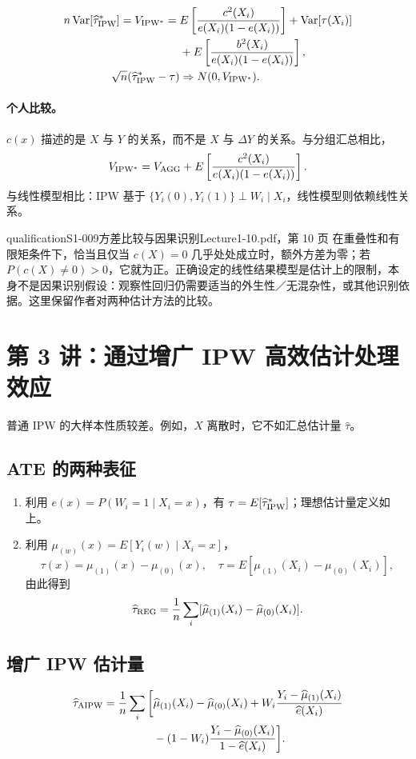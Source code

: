 \begin{align*}
n\operatorname{Var}[\widehat\tau^*_{\rm IPW}]
=V_{\rm IPW^*}
={}&E\left[\frac{c^2(X_i)}{e(X_i)(1-e(X_i))}\right]
+\operatorname{Var}[\tau(X_i)]\\
&+E\left[\frac{b^2(X_i)}{e(X_i)(1-e(X_i))}\right],\\
\sqrt n(\widehat\tau^*_{\rm IPW}-\tau)&\Rightarrow N(0,V_{\rm IPW^*}).
\end{align*}
\paragraph{个人比较。}
$c(x)$ 描述的是 $X$ 与 $Y$ 的关系，而不是 $X$ 与 $\Delta Y$ 的关系。与分组汇总相比，
\[
V_{\rm IPW^*}=V_{\rm AGG}+E\left[\frac{c^2(X_i)}{e(X_i)(1-e(X_i))}\right].
\]
与线性模型相比：IPW 基于 $\{Y_i(0),Y_i(1)\}\perp W_i\mid X_i$，线性模型则依赖线性关系。
\begin{reviewnote}{qualification}{S1-009}{方差比较与因果识别}{Lecture1-10.pdf，第 10 页}
在重叠性和有限矩条件下，恰当且仅当 $c(X)=0$ 几乎处处成立时，额外方差为零；若 $P(c(X)\ne0)>0$，它就为正。正确设定的线性结果模型是估计上的限制，本身不是因果识别假设：观察性回归仍需要适当的外生性／无混杂性，或其他识别依据。这里保留作者对两种估计方法的比较。
\end{reviewnote}



\section{第 3 讲：通过增广 IPW 高效估计处理效应}
普通 IPW 的大样本性质较差。例如，$X$ 离散时，它不如汇总估计量 $\widehat\tau$。
\subsection{ATE 的两种表征}
\begin{enumerate}
\item 利用 $e(x)=P(W_i=1\mid X_i=x)$，有 $\tau=E[\widehat\tau^*_{\rm IPW}]$；理想估计量定义如上。
\item 利用 $\mu_{(w)}(x)=E[Y_i(w)\mid X_i=x]$，
\[
\tau(x)=\mu_{(1)}(x)-\mu_{(0)}(x),\quad
\tau=E[\mu_{(1)}(X_i)-\mu_{(0)}(X_i)],
\]
由此得到
\[
\widehat\tau_{\rm REG}=\frac1n\sum_i[\widehat\mu_{(1)}(X_i)-\widehat\mu_{(0)}(X_i)].
\]
\end{enumerate}
\subsection{增广 IPW 估计量}
\begin{align*}
\widehat\tau_{\rm AIPW}=\frac1n\sum_i\bigg[&\widehat\mu_{(1)}(X_i)-\widehat\mu_{(0)}(X_i)
+W_i\frac{Y_i-\widehat\mu_{(1)}(X_i)}{\widehat e(X_i)}\\
&-(1-W_i)\frac{Y_i-\widehat\mu_{(0)}(X_i)}{1-\widehat e(X_i)}\bigg].
\end{align*}
